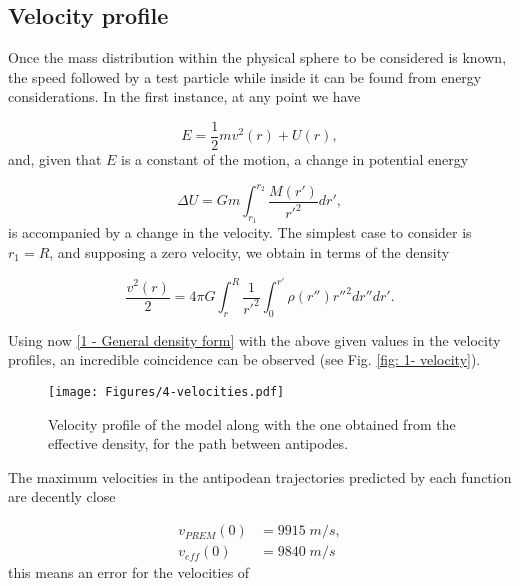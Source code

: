 \documentclass[aps,twocolumn,showpacs,preprintnumbers]{revtex4}
\begin{document}
    \subsection{Velocity profile}\label{velocity section}
    
    Once the mass distribution within the physical sphere to be considered is known, the speed followed by a test particle while inside it can be found from energy considerations. In the first instance, at any point we have
    
    \begin{equation*}
        E = \frac{1}{2} m v^2(r) + U(r),
    \end{equation*}
    and, given that $E$ is a constant of the motion, a change in potential energy
    
    \begin{equation*}
        \Delta U = G m \int_{r_1}^{r_2} \frac{M(r')}{{r'}^2} dr'  ,
    \end{equation*}
    is accompanied by a change in the velocity. The simplest case to consider is $r_1 = R$, and supposing a zero velocity, we obtain in terms of the density 
    
    \begin{equation}
        \frac{v^2(r)}{2} = 4 \pi G \int_{r}^{R} \frac{1}{{r'}^2} \int_{0}^{r'} \rho(r'') {r''}^2 dr'' dr' .
        \label{1 - v profile, general form}
    \end{equation}

    Using now \eqref{1 - General density form} with the above given values in the velocity profiles, an incredible coincidence can be observed (see Fig. \ref{fig: 1- velocity}). 
    
    \begin{figure}
        \centering
        \texttt{[image: Figures/4-velocities.pdf]}
        \caption{Velocity profile of the model along with the one obtained from the effective density, for the path between antipodes.}
        \label{fig: 1-velocity}
    \end{figure}
        
    The maximum velocities in the antipodean trajectories predicted by each function are decently close
    
    \begin{align*}
        v_{PREM}(0) &= 9915 \; m/s, \\
        v_{eff} (0) &= 9840 \; m/s 
    \end{align*}
    this means an error for the velocities of
\end{document}
